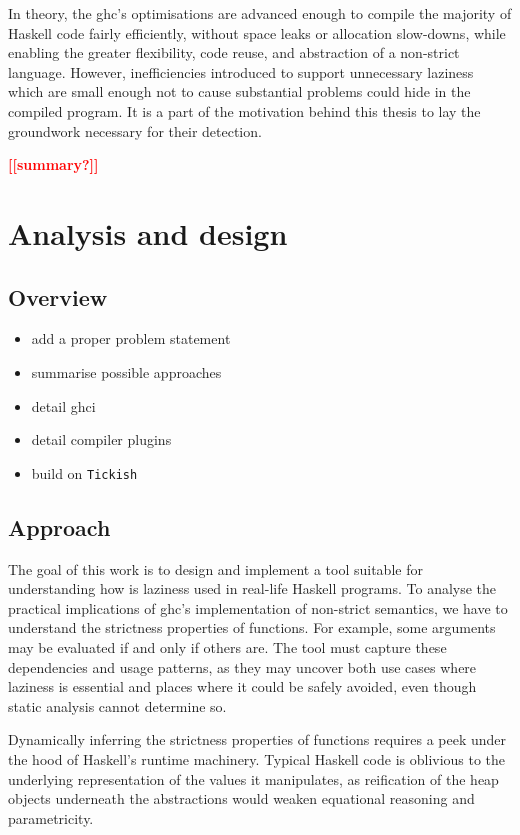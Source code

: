 \documentclass[thesis=B,english]{FITthesis}[2019/12/23]
\newcommand{\todo}[1]{\textcolor{red}{\textbf{[[#1]]}}}
\begin{document}
In theory, the \acrlong{ghc}'s optimisations are advanced enough to compile the
majority of Haskell code fairly efficiently, without space leaks or allocation
slow-downs, while enabling the greater flexibility, code reuse, and abstraction
of a non-strict language. However, inefficiencies introduced to support
unnecessary laziness which are small enough not to cause substantial problems
could hide in the compiled program. It is a part of the motivation behind this
thesis to lay the groundwork necessary for their detection.

\todo{summary?}

\chapter{Analysis and design} \label{sec:analysis-design}

\section{Overview} \label{sec:analysis-overview}
\begin{itemize}
	\item add a proper problem statement
	\item summarise possible approaches
	\item detail \acrshort{ghci}
	\item detail compiler plugins
	\item build on \texttt{Tickish}
\end{itemize}

\section{Approach} \label{sec:approach}

The goal of this work is to design and implement a tool suitable for
understanding how is laziness used in real-life Haskell programs. To analyse
the practical implications of \acrshort{ghc}'s implementation of non-strict
semantics, we have to understand the strictness properties of functions. For
example, some arguments may be evaluated if and only if others are. The tool
must capture these dependencies and usage patterns, as they may uncover both
use cases where laziness is essential and places where it could be safely
avoided, even though static analysis cannot determine so.

Dynamically inferring the strictness properties of functions requires a peek
under the hood of Haskell's runtime machinery. Typical Haskell code is
oblivious to the underlying representation of the values it manipulates, as
reification of the heap objects underneath the abstractions would weaken
equational reasoning and parametricity.
\end{document}
